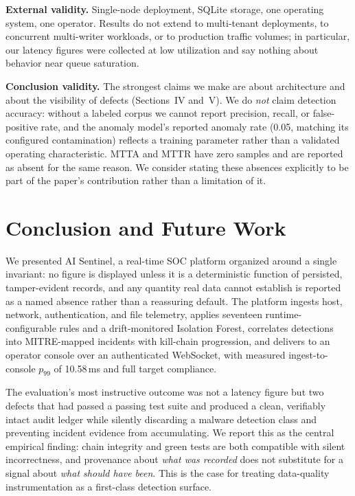 \documentclass[conference]{IEEEtran}
\begin{document}
\textbf{External validity.} Single-node deployment, SQLite storage, one
operating system, one operator. Results do not extend to multi-tenant
deployments, to concurrent multi-writer workloads, or to production traffic
volumes; in particular, our latency figures were collected at low
utilization and say nothing about behavior near queue saturation.

\textbf{Conclusion validity.} The strongest claims we make are about
architecture and about the visibility of defects (Sections~IV and~V). We do
\emph{not} claim detection accuracy: without a labeled corpus we cannot report
precision, recall, or false-positive rate, and the anomaly model's reported
anomaly rate (0.05, matching its configured contamination) reflects a
training parameter rather than a validated operating characteristic. MTTA and
MTTR have zero samples and are reported as absent for the same reason. We
consider stating these absences explicitly to be part of the paper's
contribution rather than a limitation of it.

\section{Conclusion and Future Work}

We presented AI Sentinel, a real-time SOC platform organized around a single
invariant: no figure is displayed unless it is a deterministic function of
persisted, tamper-evident records, and any quantity real data cannot
establish is reported as a named absence rather than a reassuring default.
The platform ingests host, network, authentication, and file telemetry,
applies seventeen runtime-configurable rules and a drift-monitored Isolation
Forest, correlates detections into MITRE-mapped incidents with kill-chain
progression, and delivers to an operator console over an authenticated
WebSocket, with measured ingest-to-console $p_{99}$ of 10.58\,ms and full
target compliance.

The evaluation's most instructive outcome was not a latency figure but two
defects that had passed a passing test suite and produced a clean, verifiably
intact audit ledger while silently discarding a malware detection class and
preventing incident evidence from accumulating. We report this as the
central empirical finding: chain integrity and green tests are both
compatible with silent incorrectness, and provenance about \emph{what was
recorded} does not substitute for a signal about \emph{what should have
been}. This is the case for treating data-quality instrumentation as a
first-class detection surface.
\end{document}
